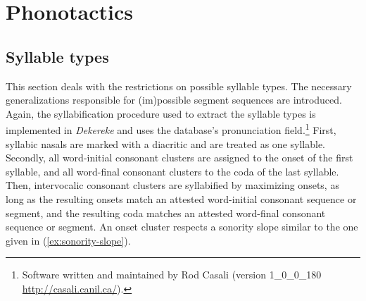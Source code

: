 \begin{table} 


 \caption{Phonetic and phonemic consonants in Chakali}
\label{tab:ConsChart}

\end{table}



\newpage 
\section{Phonotactics}
\label{sec:phonotac}


\subsection{Syllable types}
\label{sec:syllable-types}

This section deals with the restrictions on possible syllable types. The
necessary generalizations responsible for (im)possible segment sequences are
introduced. Again, the  syllabification procedure  used to 
extract the syllable types is implemented in {\it Dekereke} and uses the database's
pronunciation field.\footnote{Software 
written and maintained by Rod Casali (version 
1\_0\_0\_180 \href{http://casali.canil.ca/}{http://casali.canil.ca/}).}  
First, 
syllabic nasals are marked with a diacritic and are treated as one
syllable.  Secondly, all word-initial consonant clusters are assigned to
the onset of the first syllable, and all word-final consonant clusters to the
coda of the last syllable. Then,  intervocalic consonant clusters are
syllabified by maximizing onsets, as long as the resulting onsets match an
attested word-initial consonant sequence or segment, and the resulting coda
matches an attested word-final consonant sequence or segment. An onset cluster 
respects a sonority slope similar to the one given in
(\ref{ex:sonority-slope}). 



